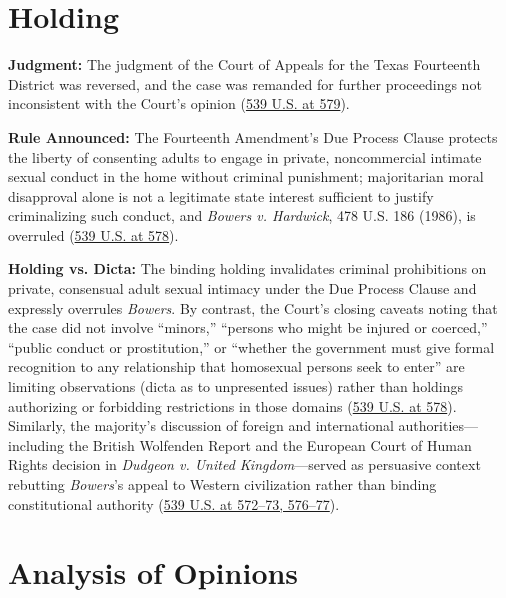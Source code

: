 \documentclass[12pt]{article}
\begin{document}
\section{Holding}
\textbf{Judgment:} The judgment of the Court of Appeals for the Texas Fourteenth District was reversed, and the case was remanded for further proceedings not inconsistent with the Court's opinion (\href{https://www.law.cornell.edu/supremecourt/text/02-102}{539 U.S. at 579}).

\textbf{Rule Announced:} The Fourteenth Amendment's Due Process Clause protects the liberty of consenting adults to engage in private, noncommercial intimate sexual conduct in the home without criminal punishment; majoritarian moral disapproval alone is not a legitimate state interest sufficient to justify criminalizing such conduct, and \textit{Bowers v. Hardwick}, 478 U.S. 186 (1986), is overruled (\href{https://www.courtlistener.com/opinion/130160/lawrence-v-texas/}{539 U.S. at 578}).

\textbf{Holding vs. Dicta:} The binding holding invalidates criminal prohibitions on private, consensual adult sexual intimacy under the Due Process Clause and expressly overrules \textit{Bowers}. By contrast, the Court's closing caveats noting that the case did not involve ``minors,'' ``persons who might be injured or coerced,'' ``public conduct or prostitution,'' or ``whether the government must give formal recognition to any relationship that homosexual persons seek to enter'' are limiting observations (dicta as to unpresented issues) rather than holdings authorizing or forbidding restrictions in those domains (\href{https://www.law.cornell.edu/supremecourt/text/02-102}{539 U.S. at 578}). Similarly, the majority's discussion of foreign and international authorities---including the British Wolfenden Report and the European Court of Human Rights decision in \textit{Dudgeon v. United Kingdom}---served as persuasive context rebutting \textit{Bowers}'s appeal to Western civilization rather than binding constitutional authority (\href{https://www.law.cornell.edu/supremecourt/text/02-102}{539 U.S. at 572--73, 576--77}).

\section{Analysis of Opinions}
\end{document}
